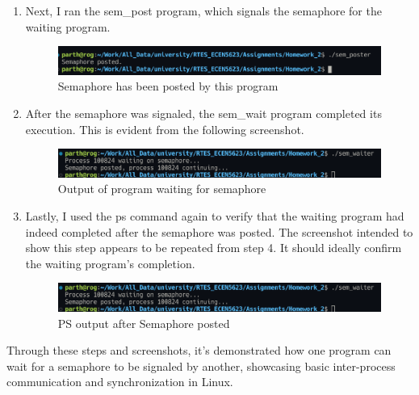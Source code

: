 \documentclass[a4paper,11pt]{article}%
\newenvironment{qanda}{\setlength{\parindent}{0pt}}{\bigskip}
\begin{document}
\begin{qanda}
\begin{enumerate}
\begin{figure}[!h]
		      \end{figure}
		\item Next, I ran the sem\_post program, which signals the semaphore for the waiting program.
		      \begin{figure}[!h]
			      \centering
			      \includegraphics[scale=0.6]{figures/sem_poster.png}
			      \caption{Semaphore has been posted by this program}

		      \end{figure}

		\item After the semaphore was signaled, the sem\_wait program completed its execution. This is evident from the following screenshot.
		      \begin{figure}[!h]
			      \centering
			      \includegraphics[scale=0.6]{figures/sem_waiter_complete.png}
			      \caption{Output of program waiting for semaphore}

		      \end{figure}

		\item Lastly, I used the ps command again to verify that the waiting program had indeed completed after the semaphore was posted. The screenshot intended to show this step appears to be repeated from step 4. It should ideally confirm the waiting program's completion.
		      \begin{figure}[!h]
			      \centering
			      \includegraphics[scale=0.6]{figures/sem_waiter_complete.png}
			      \caption{PS output after Semaphore posted}

		      \end{figure}

	\end{enumerate}

	Through these steps and screenshots, it's demonstrated how one program can wait for a semaphore to be signaled by another, showcasing basic inter-process communication and synchronization in Linux.




\end{qanda}
\end{document}
